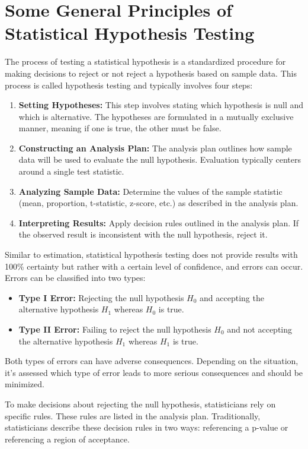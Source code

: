 \section{Some General Principles of Statistical Hypothesis Testing}
The process of testing a statistical hypothesis is a standardized procedure for making decisions to reject or not reject a hypothesis based on sample data. This process is called hypothesis testing and typically involves four steps:

\begin{enumerate}
 \item \textbf{Setting Hypotheses:} This step involves stating which hypothesis is null and which is alternative. The hypotheses are formulated in a mutually exclusive manner, meaning if one is true, the other must be false.
 \item \textbf{Constructing an Analysis Plan:} The analysis plan outlines how sample data will be used to evaluate the null hypothesis. Evaluation typically centers around a single test statistic.
 \item \textbf{Analyzing Sample Data:} Determine the values of the sample statistic (mean, proportion, t-statistic, z-score, etc.) as described in the analysis plan.
 \item \textbf{Interpreting Results:} Apply decision rules outlined in the analysis plan. If the observed result is inconsistent with the null hypothesis, reject it.
\end{enumerate}

Similar to estimation, statistical hypothesis testing does not provide results with 100\% certainty but rather with a certain level of confidence, and errors can occur. Errors can be classified into two types:

\begin{itemize}
 \item \textbf{Type I Error:} Rejecting the null hypothesis $H_0$
       and accepting the alternative hypothesis $H_1$ whereas $H_0$ is true.
 \item \textbf{Type II Error:} Failing to reject the null hypothesis $H_0$ and not accepting the alternative hypothesis $H_1$ whereas $H_1$ is true.
\end{itemize}

Both types of errors can have adverse consequences. Depending on the situation, it's assessed which type of error leads to more serious consequences and should be minimized.

To make decisions about rejecting the null hypothesis, statisticians rely on specific rules. These rules are listed in the analysis plan. Traditionally, statisticians describe these decision rules in two ways: referencing a p-value or referencing a region of acceptance.


